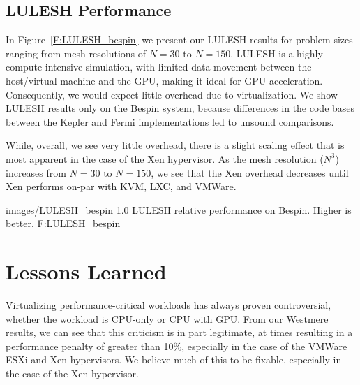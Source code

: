 \subsection{LULESH Performance}

In Figure~\ref{F:LULESH_bespin} we present our LULESH results for problem sizes
ranging from mesh resolutions of $N=30$ to $N=150$.  LULESH is a highly compute-intensive
simulation, with limited data movement between the host/virtual machine and the
GPU, making it ideal for GPU acceleration. Consequently, we would expect
little overhead due to virtualization. We show LULESH results only on the Bespin
system, because differences in the code bases between the Kepler and Fermi
implementations led to unsound comparisons.

While, overall, we see very little overhead, there is a
slight scaling effect that is most apparent in the case of the Xen hypervisor.
As the mesh resolution ($N^3$) increases from $N=30$ to $N=150$, we see that the Xen
overhead decreases until Xen performs on-par with
KVM, LXC, and VMWare.  


  {images/LULESH_bespin}
  {1.0}
  {LULESH relative performance on Bespin. Higher is better.}
  {F:LULESH_bespin} 



\section{Lessons Learned}\label{LESSONS}

Virtualizing performance-critical workloads has always proven controversial,
whether the workload is CPU-only \cite{Younge2011cloud} or CPU with GPU.  From our Westmere results, we
can see that this criticism is in part legitimate, at times resulting in a performance
penalty of greater than 10\%, especially in the case of the VMWare ESXi and Xen
hypervisors.  We believe much of this to be fixable, especially in the case of
the Xen hypervisor.  

